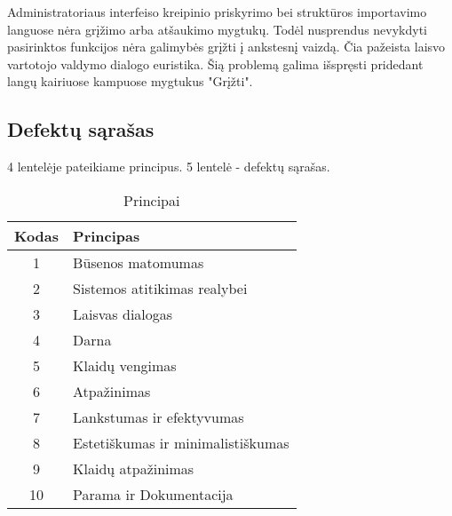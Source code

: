 		Administratoriaus interfeiso kreipinio priskyrimo bei struktūros importavimo languose nėra grįžimo arba atšaukimo mygtukų.
		Todėl nusprendus nevykdyti pasirinktos funkcijos nėra galimybės grįžti į ankstesnį vaizdą.
		Čia pažeista laisvo vartotojo valdymo dialogo euristika.
		Šią problemą galima išspręsti pridedant langų kairiuose kampuose mygtukus "Grįžti".
	
\newpage	
	
\subsection{Defektų sąrašas}

4 lentelėje pateikiame principus. 5 lentelė - defektų sąrašas.

	\begin{table}[h] 
		\caption{Principai} %
		\centering %
		\begin{tabular}{c l} %
			\hline\hline %
			Kodas & Principas\\ [0.5pt] %
			\hline %
			1 & Būsenos matomumas \\
			2 & Sistemos atitikimas realybei \\
			3 & Laisvas dialogas \\
			4 & Darna \\
			5 & Klaidų vengimas \\
			6 & Atpažinimas \\
			7 & Lankstumas ir efektyvumas \\
			8 & Estetiškumas ir minimalistiškumas \\
			9 & Klaidų atpažinimas \\
			10 & Parama ir Dokumentacija \\
			\hline %
		\end{tabular} 
		\label{table:principai} %
	\end{table} 

